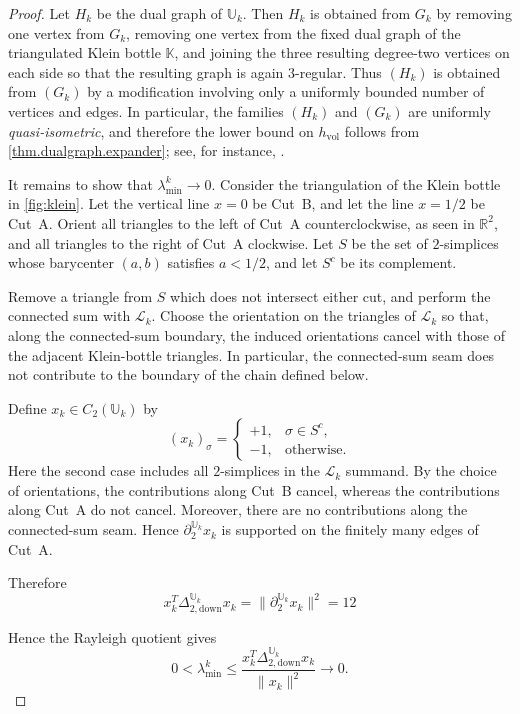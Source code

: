 \documentclass{article}
\newcommand{\LL}{\mathcal{L}}
\begin{document}
\begin{proof}
Let \(H_k\) be the dual graph of \(\mathbb U_k\). Then \(H_k\) is
obtained from \(G_k\) by removing one vertex from \(G_k\), removing one
vertex from the fixed dual graph of the triangulated Klein bottle
\(\mathbb K\), and joining the three resulting degree-two vertices on
each side so that the resulting graph is again \(3\)-regular. Thus
\((H_k)\) is obtained from \((G_k)\) by a modification involving only a
uniformly bounded number of vertices and edges. In particular, the
families \((H_k)\) and \((G_k)\) are uniformly \emph{quasi-isometric}, and therefore the lower bound on \(h_{\mathrm{vol}}\) follows
from \cref{thm.dualgraph.expander}; see, for instance,
\cite[Lemma~4.4]{sawicki2020super}. 

It remains to show that \(\lambda_{\min}^k\to 0\). Consider the
triangulation of the Klein bottle in \cref{fig:klein}. Let the vertical
line \(x=0\) be Cut~B, and let the line \(x=1/2\) be Cut~A. Orient all
triangles to the left of Cut~A counterclockwise, as seen in
\(\mathbb R^2\), and all triangles to the right of Cut~A clockwise. Let
\(S\) be the set of \(2\)-simplices whose barycenter \((a,b)\) satisfies
\(a<1/2\), and let \(S^c\) be its complement.

Remove a triangle from \(S\) which does not intersect either cut, and
perform the connected sum with \(\LL_k\). Choose the orientation on the
triangles of \(\LL_k\) so that, along the connected-sum boundary, the
induced orientations cancel with those of the adjacent Klein-bottle
triangles. In particular, the connected-sum seam does not contribute to
the boundary of the chain defined below.

Define \(x_k\in C_2(\mathbb U_k)\) by
\[
(x_k)_\sigma =
\begin{cases}
+1, & \sigma\in S^c,\\
-1, & \text{otherwise}.
\end{cases}
\]
Here the second case includes all \(2\)-simplices in the \(\LL_k\)
summand. By the choice of orientations, the contributions along Cut~B
cancel, whereas the contributions along Cut~A do not cancel. Moreover,
there are no contributions along the connected-sum seam. Hence
\(\partial_{2}^{\mathbb{U}_k}x_k\) is supported on the finitely many edges of Cut~A.

Therefore
\[
    x_k^T\Delta_{2,\mathrm{down}}^{{\mathbb U}_k}x_k
    =
    \|\partial_{2}^{\mathbb{U}_k}x_k\|^2 = 12
\]

Hence the Rayleigh quotient gives
\[
    0<\lambda_{\min}^k
    \leq
    \frac{x_k^T\Delta_{2,\mathrm{down}}^{\mathbb U_k}x_k}
         {\|x_k\|^2}
    \longrightarrow 0.
\]
\end{proof}
\end{document}
